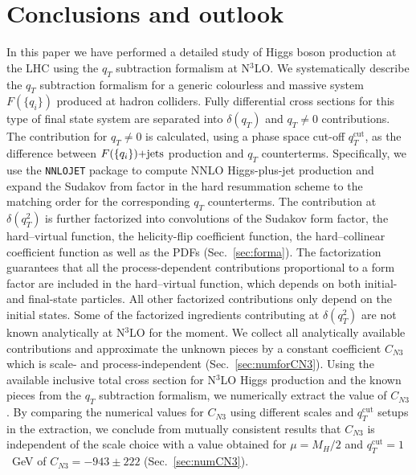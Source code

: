 \documentclass[12pt]{article}
\DeclareRobustCommand{\qt}{q_T}
\DeclareRobustCommand{\qtcut}{\ensuremath{q_T^\mathrm{cut}}}
\begin{document}
\section{Conclusions and outlook}
\label{Sec:conclu}
In this paper we have performed a detailed study of Higgs boson production at the LHC using the $\qt$ subtraction formalism at N$^3$LO. We systematically describe the $\qt$ subtraction formalism for a generic colourless and massive system $F(\{q_i\})$ produced at hadron colliders. Fully differential cross sections for this type of final state system are separated into $\delta(\qt)$ and $\qt\ne 0$ contributions. The contribution for $\qt\ne 0$ is calculated, 
using a phase space cut-off $\qtcut$, as the difference between $F(\{q_i\})\rm{+jets}$ production and $\qt$ counterterms. Specifically, we use the \texttt{NNLOJET} package to compute NNLO Higgs-plus-jet production and expand the Sudakov from factor in the hard resummation scheme to the matching order for the corresponding $\qt$ counterterms. The contribution at $\delta(\qt^{2})$ is further factorized into convolutions of the Sudakov form factor, the hard--virtual function, the helicity-flip coefficient function, the hard--collinear coefficient function as well as the PDFs (Sec.~\ref{sec:forma}). The factorization guarantees that all the process-dependent contributions proportional to a form factor are included in the hard--virtual function, which depends on both initial- and final-state particles. All other factorized contributions only depend on the initial states. Some of the factorized ingredients contributing at $\delta(\qt^{2})$ are not known analytically at N$^3$LO for the moment. We collect all analytically available contributions and approximate the unknown pieces by a constant coefficient $C_{N3}$ which is scale- and process-independent (Sec.~\ref{sec:numforCN3}). Using the available inclusive total cross section for N$^3$LO Higgs production and the known pieces from  the $\qt$ subtraction formalism, we numerically extract the value of $C_{N3}$. By comparing the numerical values for $C_{N3}$ using different scales and $\qtcut$ setups in the extraction, we conclude from mutually consistent results that $C_{N3}$ is independent of the scale choice with a value obtained for $\mu=M_H/2$ and $\qtcut = 1$~GeV of $C_{N3}=-943\pm 222$ (Sec.~\ref{sec:numCN3}).
\end{document}
